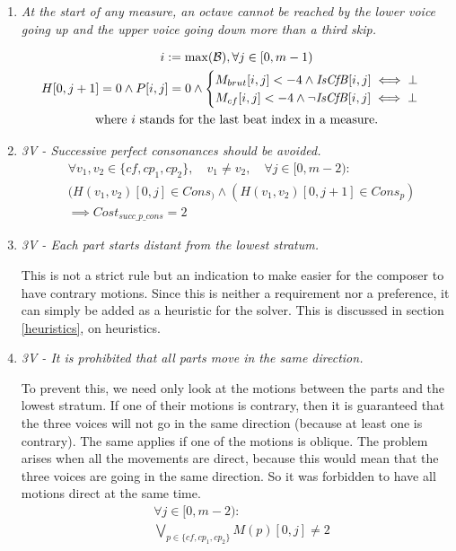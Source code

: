 \begin{enumerate}[wide, label=\bfseries 1.P\arabic*]
\item\label{rule:battuta}{ \textit{At the start of any measure, an octave cannot be reached by the lower voice going up and the upper voice going down more than a third skip.}}


\begin{equation}
    \begin{gathered}
        i := \max (\mathcal{B}), \forall j \in [0, m-1)\\
        H[0, j+1] = 0 \land P[i, j] = 0 \land \begin{cases}
            M_{brut}[i, j] < -4 \land \mathit{IsCfB}[i, j] \iff \bot\\
            M_{cf}[i, j] < -4 \land \lnot \mathit{IsCfB}[i, j] \iff \bot
        \end{cases}\\
        \text{where } i \text{ stands for the last beat index in a measure.}
    \end{gathered}
    \label{eq:battuta}
\end{equation}

\item \textit{3V - Successive perfect consonances should be avoided.}
\begin{equation} \begin{aligned}
    &\forall v_1, v_2 \in \{cf, cp_1, cp_2\}, \quad v_1 \neq v_2, \quad \forall j \in [0, m-2) \colon\\
    &(H(v_1,v_2)[0, j] \in Cons_) \land (H(v_1,v_2)[0, j+1] \in Cons_p)\\
    &\implies Cost_{succ\_p\_cons} = 2
    \end{aligned} \end{equation}

    \item  \textit{3V - Each part starts distant from the lowest stratum.}

    This is not a strict rule but an indication to make easier for the composer to have contrary motions. Since this is neither a requirement nor a preference, it can simply be added as a heuristic for the solver. This is discussed in section \ref{heuristics}, on heuristics.


    \item \textit{3V - It is prohibited that all parts move in the same direction.}

    To prevent this, we need only look at the motions between the parts and the lowest stratum. If one of their motions is contrary, then it is guaranteed that the three voices will not go in the same direction (because at least one is contrary). The same applies if one of the motions is oblique. The problem arises when all the movements are direct, because this would mean that the three voices are going in the same direction. So it was forbidden to have all motions direct at the same time.
    \begin{equation} \begin{aligned}
    &\forall j \in [0, m-2) \colon\\
    &\bigvee_{p \in \{cf, cp_1, cp_2\}}  M(p)[0, j] \neq 2
    \end{aligned} \end{equation}


\end{enumerate}
